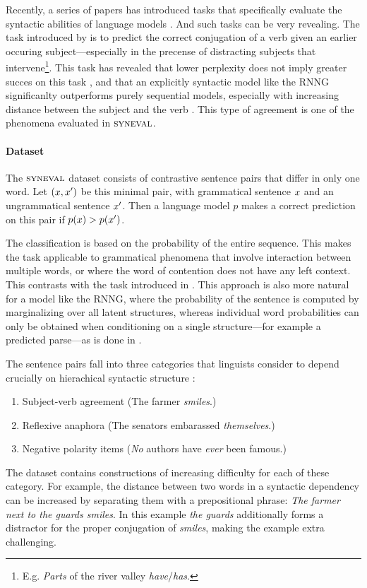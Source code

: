 Recently, a series of papers has introduced tasks that specifically evaluate the syntactic abilities of language models \citep{linzen2016syntax,gulordava2018colorless,linzen2018targeted}. And such tasks can be very revealing. The task introduced by \citet{linzen2016syntax} is to predict the correct conjugation of a verb given an earlier occuring subject---especially in the precense of distracting subjects that intervene\footnote{E.g. \textit{Parts} of the river valley \textit{have}/\textit{has}.}. This task has revealed that lower perplexity does not imply greater succes on this task \citep{tran2018recurrent}, and that an explicitly syntactic model like the RNNG significanlty outperforms purely sequential models, especially with increasing distance between the subject and the verb \citep{kuncoro2018learn}. This type of agreement is one of the phenomena evaluated in $\textsc{syneval}$.

\paragraph{Dataset}
The $\textsc{syneval}$ dataset consists of contrastive sentence pairs that differ in only one word. Let $(x, x')$ be this minimal pair, with grammatical sentence $x$ and an ungrammatical sentence $x'$. Then a language model $p$ makes a correct prediction on this pair if $p(x) > p(x')$.

The classification is based on the probability of the entire sequence. This makes the task applicable to grammatical phenomena that involve interaction between multiple words, or where the word of contention does not have any left context. This contrasts with the task introduced in \citet{linzen2016syntax}. This approach is also more natural for a model like the RNNG, where the probability of the sentence is computed by marginalizing over all latent structures, whereas individual word probabilities can only be obtained when conditioning on a single structure---for example a predicted parse---as is done in \cite{kuncoro2018learn}.

The sentence pairs fall into three categories that linguists consider to depend crucially on hierachical syntactic structure \citep{everaert2015structures,xiang2009illusory}:
  \begin{enumerate}[noitemsep]
    \item Subject-verb agreement (The farmer \textit{smiles}.)
    \item Reflexive anaphora (The senators embarassed \textit{themselves}.)
    \item Negative polarity items (\textit{No} authors have \textit{ever} been famous.)
  \end{enumerate}
The dataset contains constructions of increasing difficulty for each of these category. For example, the distance between two words in a syntactic dependency can be increased by separating them with a prepositional phrase: \textit{The farmer next to the guards smiles}. In this example \textit{the guards} additionally forms a distractor for the proper conjugation of \textit{smiles}, making the example extra challenging.

